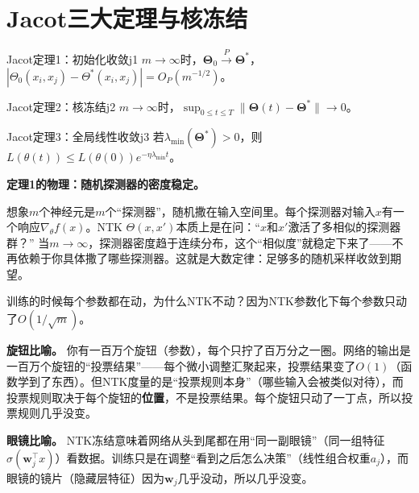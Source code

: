\documentclass[11pt,a4paper]{article}
\newcommand{\bTheta}{\boldsymbol{\Theta}}
\newcommand{\bw}{\mathbf{w}}
\begin{document}
\section{Jacot三大定理与核冻结}

\begin{theorem}{Jacot定理1：初始化收敛}{j1}
$m\to\infty$时，$\bTheta_0\xrightarrow{P}\bTheta^*$，$|\Theta_0(x_i,x_j)-\Theta^*(x_i,x_j)|=O_P(m^{-1/2})$。
\end{theorem}

\begin{theorem}{Jacot定理2：核冻结}{j2}
$m\to\infty$时，$\sup_{0\le t\le T}\|\bTheta(t)-\bTheta^*\|\to 0$。
\end{theorem}

\begin{theorem}{Jacot定理3：全局线性收敛}{j3}
若$\lambda_{\min}(\bTheta^*)>0$，则$L(\theta(t))\le L(\theta(0))e^{-\eta\lambda_{\min}t}$。
\end{theorem}

\begin{keyinsight}

\textbf{定理1的物理：随机探测器的密度稳定。}

想象$m$个神经元是$m$个``探测器''，随机撒在输入空间里。每个探测器对输入$x$有一个响应$\nabla_\theta f(x)$。NTK $\Theta(x,x')$本质上是在问：``$x$和$x'$激活了多相似的探测器群？'' 当$m\to\infty$，探测器密度趋于连续分布，这个``相似度''就稳定下来了——不再依赖于你具体撒了哪些探测器。这就是大数定律：足够多的随机采样收敛到期望。
\end{keyinsight}

\begin{keyinsight}

训练的时候每个参数都在动，为什么NTK不动？因为NTK参数化下每个参数只动了$O(1/\sqrt{m})$。

\textbf{旋钮比喻。} 你有一百万个旋钮（参数），每个只拧了百万分之一圈。网络的输出是一百万个旋钮的``投票结果''——每个微小调整汇聚起来，投票结果变了$O(1)$（函数学到了东西）。但NTK度量的是``投票规则本身''（哪些输入会被类似对待），而投票规则取决于每个旋钮的\textbf{位置}，不是投票结果。每个旋钮只动了一丁点，所以投票规则几乎没变。

\textbf{眼镜比喻。} NTK冻结意味着网络从头到尾都在用``同一副眼镜''（同一组特征$\sigma(\bw_j^\top x)$）看数据。训练只是在调整``看到之后怎么决策''（线性组合权重$a_j$），而眼镜的镜片（隐藏层特征）因为$\bw_j$几乎没动，所以几乎没变。
\end{keyinsight}
\end{document}

